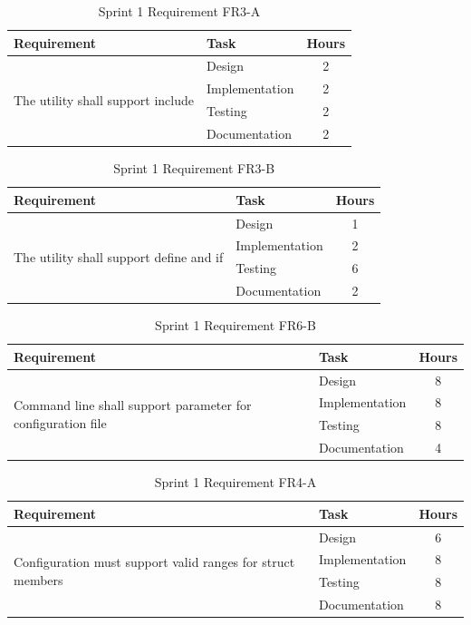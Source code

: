 \begin{table}[!ht] \small \center
\caption{Sprint 1 Requirement FR3-A\label{tab:sp1_req3a}}
\begin{tabular}{l l c}
	\toprule
	Requirement & Task & Hours \\
	\midrule
	\multirow{4}{5cm}{The \gls{utility} shall support \gls{include}} & Design & 2 \\
	& Implementation & 2 \\
	& Testing & 2 \\
	& Documentation & 2 \\
	\bottomrule
\end{tabular}
\end{table}

\begin{table}[!ht] \small \center
\caption{Sprint 1 Requirement FR3-B\label{tab:sp1_req3b}}
\begin{tabular}{l l c}
	\toprule
	Requirement & Task & Hours \\
	\midrule
	\multirow{4}{5cm}{The \gls{utility} shall support \gls{define} and \gls{if}} & Design & 1 \\
	& Implementation & 2 \\
	& Testing & 6 \\
	& Documentation & 2 \\
	\bottomrule
\end{tabular}
\end{table}

\begin{table}[!ht] \small \center
\caption{Sprint 1 Requirement FR6-B\label{tab:sp1_req7b}}
\begin{tabular}{l l c}
	\toprule
	Requirement & Task & Hours \\
	\midrule
	\multirow{4}{5cm}{Command line shall support parameter for configuration file} & Design & 8 \\
	& Implementation & 8 \\
	& Testing & 8 \\
	& Documentation & 4 \\
	\bottomrule
\end{tabular}
\end{table}

\begin{table}[!ht] \small \center
\caption{Sprint 1 Requirement FR4-A\label{tab:sp1_req4a}}
\begin{tabular}{l l c}
	\toprule
	Requirement & Task & Hours \\
	\midrule
	\multirow{4}{5cm}{Configuration must support valid ranges for \gls{struct} \glspl{member}} & Design & 6 \\
	& Implementation & 8 \\
	& Testing & 8 \\
	& Documentation & 8 \\
	\bottomrule
\end{tabular}
\end{table}

